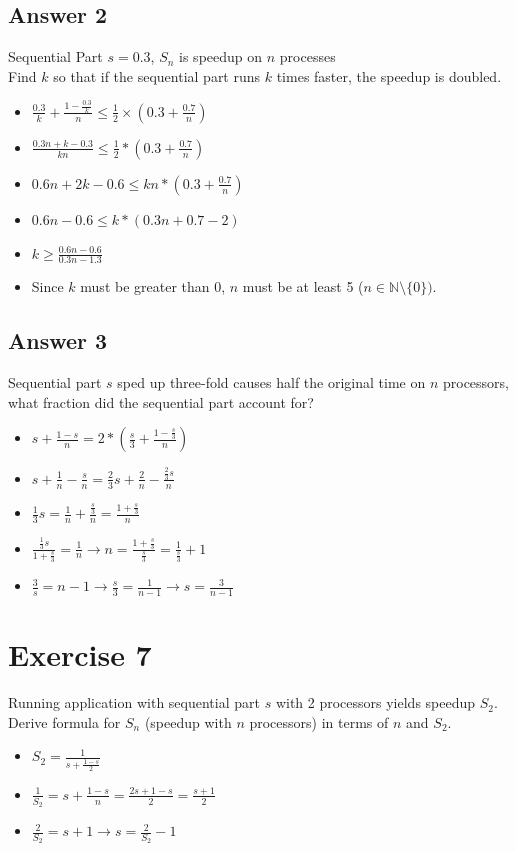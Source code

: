 \documentclass[a4paper,%
11pt,%
DIV=14,
headsepline,%
headings=normal,
]{scrartcl}
\newcommand{\exercise}[1]{\section*{Exercise #1}}
\newcommand{\answer}[1]{\subsection*{Answer #1}}
\begin{document}
\answer{2}
	Sequential Part $s = 0.3$, $S_n$ is speedup on $n$ processes\\
	Find $k$ so that if the sequential part runs $k$ times faster, the speedup is doubled.\\
	\begin{itemize}
	\item $\frac{0.3}{k} + \frac{1 - \frac{0.3}{k}}{n} \leq \frac{1}{2} \times (0.3 + \frac{0.7}{n})$
	\item $\frac{0.3n + k - 0.3}{kn} \leq \frac{1}{2} * (0.3 + \frac{0.7}{n})$
	\item $0.6n + 2k - 0.6 \leq kn * (0.3 + \frac{0.7}{n})$
	\item $0.6n - 0.6 \leq k*(0.3n+0.7-2)$
	\item $k \geq \frac{0.6n-0.6}{0.3n-1.3}$
	\item Since $k$ must be greater than 0, $n$ must be at least 5 ($n \in \mathbb{N}\setminus{\{0\}})$.
	\end{itemize}

\answer{3}
	Sequential part $s$ sped up three-fold causes half the original time on $n$ processors, what fraction did the sequential part account for?
	\begin{itemize}
	\item $s + \frac{1-s}{n} = 2 * (\frac{s}{3} + \frac{1-\frac{s}{3}}{n})$
	\item $s + \frac{1}{n} - \frac{s}{n} = \frac{2}{3}s + \frac{2}{n} - \frac{\frac{2}{3}s}{n}$
	\item $\frac{1}{3}s = \frac{1}{n} + \frac{\frac{s}{3}}{n} = \frac{1+\frac{s}{3}}{n}$
	\item $\frac{\frac{1}{3}s}{1+\frac{s}{3}} = \frac{1}{n} \rightarrow n = \frac{1+\frac{s}{3}}{\frac{s}{3}} = \frac{1}{\frac{s}{3}} + 1$
 	\item $\frac{3}{s} = n-1 \rightarrow \frac{s}{3} = \frac{1}{n-1} \rightarrow s = \frac{3}{n-1}$
	\end{itemize}


\exercise{7}

Running application with sequential part $s$ with 2 processors yields speedup $S_2$. Derive formula for $S_n$ (speedup with $n$ processors) in terms of $n$ and $S_2$. 

\begin{itemize}
\item $S_2 = \frac{1}{s + \frac{1-s}{2}}$
\item $\frac{1}{S_2} = s + \frac{1-s}{n} = \frac{2s+1-s}{2} = \frac{s+1}{2}$
\item $\frac{2}{S_2} = s+1 \rightarrow s = \frac{2}{S_2}-1$
\end{itemize}
\end{document}
